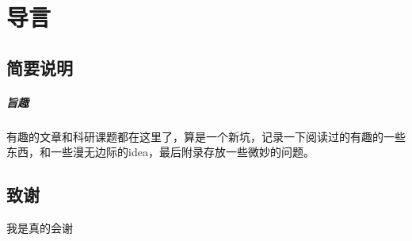 
\chapter*{导言}	%

\section*{简要说明}
\paragraph*{旨趣}
有趣的文章和科研课题都在这里了，算是一个新坑，记录一下阅读过的有趣的一些东西，和一些漫无边际的idea，最后附录存放一些微妙的问题。
\section*{致谢}
\begin{hint}
	我是真的会谢
\end{hint}